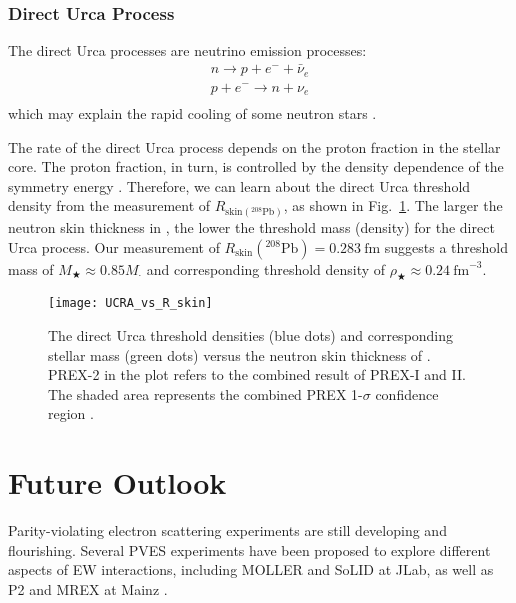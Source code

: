 \subsubsection{Direct Urca Process}
The direct Urca processes are neutrino emission processes: 
\begin{equation}
    \begin{gathered}
	n \rightarrow p + e^- + \bar{\nu}_e \\
	p + e^- \rightarrow n + \nu_e \\
    \end{gathered}
\end{equation}
which may explain the rapid cooling of some neutron stars \cite{Haensel1995}. 

The rate of the direct Urca process depends on the proton fraction in the stellar
core. The proton fraction, in turn, is controlled by the density dependence of 
the symmetry energy \cite{PhysRevLett.120.182701}. Therefore, we can learn about
the direct Urca threshold density from the measurement of $R_{\text{skin}({}^{208}\text{Pb})}$,
as shown in Fig.~\ref{fig:DUrca}. 
The larger the neutron skin thickness in \Pb, the lower the threshold mass (density) 
for the direct Urca process. Our measurement of $R_{\text{skin}}({}^{208}\text{Pb}) = 0.283\ \mathrm{fm}$
suggests a threshold mass of $M_\bigstar \approx 0.85 M_\cdot$ and corresponding
threshold density of $\rho_\bigstar \approx 0.24\ \mathrm{fm}^{-3}$.
\begin{figure}[!h]
    \centering
    \texttt{[image: UCRA\_vs\_R\_skin]}
    \caption[Direct Urca threshold]
    {The direct Urca threshold densities (blue dots) and corresponding 
    stellar mass (green dots) versus the neutron skin thickness of \Pb. PREX-2 
    in the plot refers to the combined result of PREX-I and II.
    The shaded area represents the combined PREX 1-$\sigma$ confidence region \cite{PhysRevLett.126.172503}.}
    \label{fig:DUrca}
\end{figure}

\section{Future Outlook}
Parity-violating electron scattering experiments are still developing and flourishing.
Several PVES experiments have been proposed to explore different aspects of EW
interactions, including MOLLER \cite{MOLLER} and SoLID \cite{SoLID} at JLab, 
as well as P2 and MREX at Mainz \cite{Becker2018}.

